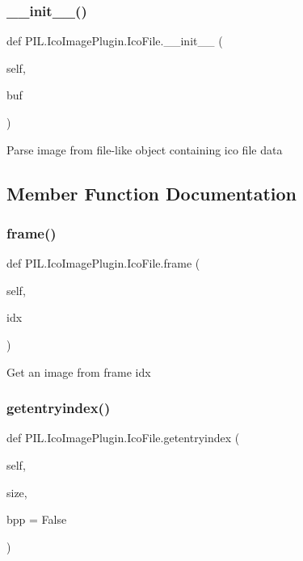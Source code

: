 \subsubsection{\texorpdfstring{\+\_\+\+\_\+init\+\_\+\+\_\+()}{\_\_init\_\_()}}
{\footnotesize\ttfamily def P\+I\+L.\+Ico\+Image\+Plugin.\+Ico\+File.\+\_\+\+\_\+init\+\_\+\+\_\+ (\begin{DoxyParamCaption}\item[{}]{self,  }\item[{}]{buf }\end{DoxyParamCaption})}

\begin{DoxyVerb}Parse image from file-like object containing ico file data
\end{DoxyVerb}
 

\subsection{Member Function Documentation}
\mbox{\label{classPIL_1_1IcoImagePlugin_1_1IcoFile_a40ea25794e5c3b69a5bf8b3b1080ba43}} 
\subsubsection{\texorpdfstring{frame()}{frame()}}
{\footnotesize\ttfamily def P\+I\+L.\+Ico\+Image\+Plugin.\+Ico\+File.\+frame (\begin{DoxyParamCaption}\item[{}]{self,  }\item[{}]{idx }\end{DoxyParamCaption})}

\begin{DoxyVerb}Get an image from frame idx
\end{DoxyVerb}
 \mbox{\label{classPIL_1_1IcoImagePlugin_1_1IcoFile_a76accdd0e4245c2a2f706e0d480910fa}} 
\subsubsection{\texorpdfstring{getentryindex()}{getentryindex()}}
{\footnotesize\ttfamily def P\+I\+L.\+Ico\+Image\+Plugin.\+Ico\+File.\+getentryindex (\begin{DoxyParamCaption}\item[{}]{self,  }\item[{}]{size,  }\item[{}]{bpp = {\ttfamily False} }\end{DoxyParamCaption})}

